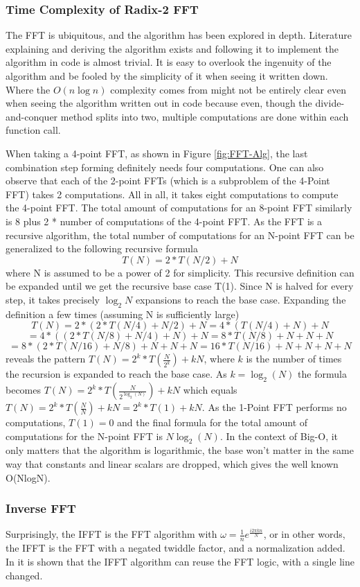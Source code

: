 \subsubsection{Time Complexity of Radix-2 FFT}
The FFT is ubiquitous, and the algorithm has been explored in depth. Literature explaining and deriving the algorithm exists and following it to implement the algorithm in code is almost trivial. It is easy to overlook the ingenuity of the algorithm and be fooled by the simplicity of it when seeing it written down. Where the $O(n\log n)$ complexity comes from might not be entirely clear even when seeing the algorithm written out in code because even, though the divide-and-conquer method splits into two, multiple computations are done within each function call. 

When taking a 4-point FFT, as shown in Figure \ref{fig:FFT-Alg}, the last combination step forming definitely needs four computations. One can also observe that each of the 2-point FFTs (which is a subproblem of the 4-Point FFT) takes 2 computations. All in all, it takes eight computations to compute the 4-point FFT. The total amount of computations for an 8-point FFT similarly is 8 plus 2 * number of computations of the 4-point FFT. As the FFT is a recursive algorithm, the total number of computations for an N-point FFT can be generalized to the following recursive formula
$$T(N) = 2*T(N/2) + N$$
where N is assumed to be a power of 2 for simplicity. This recursive definition can be expanded
until we get the recursive base case T(1). Since N is halved for every step, it takes precisely $\log_2 N$ expansions to reach the base case. Expanding the definition a few times (assuming N is sufficiently large)
$$T(N) = 2*(2*T(N/4) + N/2) + N = 4*(T(N/4) + N) + N$$
$$= 4*((2*T(N/8)+N/4) + N) + N = 8*T(N/8) + N + N + N$$
$$= 8*(2*T(N/16) + N/8) + N + N + N = 16*T(N/16) + N + N + N + N$$
reveals the pattern $T(N) = 2^k*T(\frac{N}{2^k}) + kN$, where $k$ is the number of times the recursion is expanded to reach the base case. As $k =\log_2(N)$ the formula becomes $T(N) = 2^k*T(\frac{N}{2^{\log_2(N)}}) + kN$ which equals $T(N) = 2^k*T(\frac{N}{N}) + kN = 2^k * T(1) + kN$. As the 1-Point FFT performs no computations, $T(1) = 0$ and the final formula for the total amount of computations for the N-point FFT is $N \log_2(N)$. In the context of Big-O, it only matters that the algorithm is logarithmic, the base won't matter in the same way that constants and linear scalars are dropped, which gives the well known O(NlogN).

\subsubsection{Inverse FFT}
Surprisingly, the IFFT is the FFT algorithm with $\omega = \frac{1}{n}e^{\frac{i2\pi kn}{N}}$, or in other words, the IFFT is the FFT with a negated twiddle factor, and a normalization added. In \cite{Reducible2020} it is shown that the IFFT algorithm can reuse the FFT logic, with a single line changed. 

